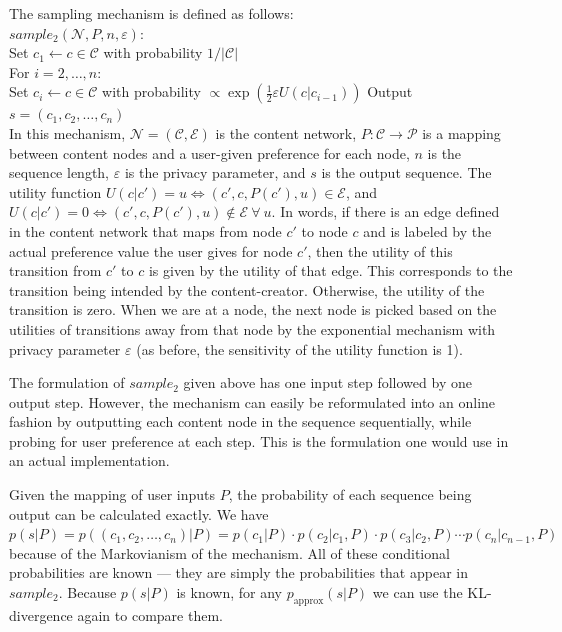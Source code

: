 \documentclass[preprint2]{aastex}
\begin{document}
The sampling mechanism is defined as follows: \\
\newpage
\noindent\(sample_2(\mathcal{N}, P, n, \varepsilon):\) \\
\indent Set \(c_1 \leftarrow c \in \mathcal{C}\) with probability \(1 / |\mathcal{C}|\) \\
\indent For \(i = 2, \dots, n\):\\
\indent \indent Set \(c_i \leftarrow c \in \mathcal{C}\) with probability \(\propto \exp\left( \frac{1}{2} \varepsilon U(c | c_{i-1}) \right)\)
\indent Output \(s = (c_1, c_2, \dots, c_n)\) \\

In this mechanism, \(\mathcal{N} = (\mathcal{C}, \mathcal{E})\) is the content network, \(P : \mathcal{C} \rightarrow \mathcal{P}\) is a mapping between content nodes and a user-given preference for each node, \(n\) is the sequence length, \(\varepsilon\) is the privacy parameter, and \(s\) is the output sequence. The utility function \(U(c|c') = u \Leftrightarrow (c', c, P(c'), u) \in \mathcal{E}\), and \(U(c|c') = 0 \Leftrightarrow (c', c, P(c'), u) \notin \mathcal{E} \ \forall\  u\). In words, if there is an edge defined in the content network that maps from node \(c'\) to node \(c\) and is labeled by the actual preference value the user gives for node \(c'\), then the utility of this transition from \(c'\) to \(c\) is given by the utility of that edge. This corresponds to the transition being intended by the content-creator. Otherwise, the utility of the transition is zero. When we are at a node, the next node is picked based on the utilities of transitions away from that node by the exponential mechanism with privacy parameter \(\varepsilon\) (as before, the sensitivity of the utility function is 1).

The formulation of \(sample_2\) given above has one input step followed by one output step. However, the mechanism can easily be reformulated into an online fashion by outputting each content node in the sequence sequentially, while probing for user preference at each step. This is the formulation one would use in an actual implementation.

Given the mapping of user inputs \(P\), the probability of each sequence being output can be calculated exactly. We have \(p(s|P) = p((c_1, c_2, \dots, c_n) | P) = p(c_1 | P) \cdot p(c_2 | c_1, P) \cdot p(c_3 | c_2, P) \cdots p(c_n | c_{n-1}, P)\) because of the Markovianism of the mechanism. All of these conditional probabilities are known --- they are simply the probabilities that appear in \(sample_2\). Because \(p(s|P)\) is known, for any \(p_\text{approx}(s|P)\) we can use the KL-divergence again to compare them.
\end{document}
